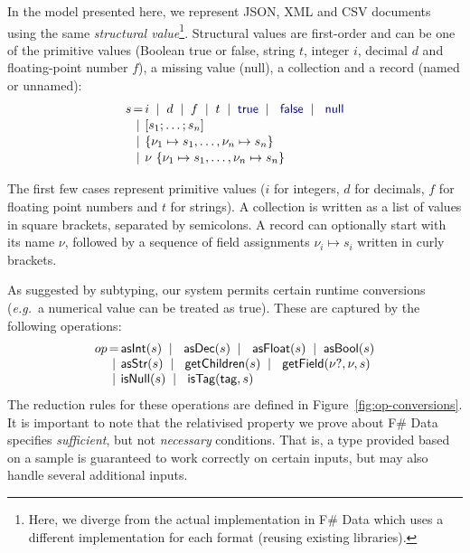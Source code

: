 \documentclass[preprint]{sigplanconf}
\newcommand{\kvd}[1]{\textnormal{\textcolor{kvdclr}{\sffamily #1}}}
\newcommand{\num}[1]{\textnormal{\textcolor{numclr}{\sffamily #1}}}
\newcommand{\ident}[1]{\textnormal{\sffamily #1}}
\newcommand{\lsep}[0]{\;\; | \;\;}
\newcommand{\narrow}[1]{\hspace{-0.85em} #1 \hspace{-0.85em}}
\begin{document}
In the model presented here, we represent JSON, XML and CSV documents using the same 
\emph{structural value}\footnote{Here, we diverge from the actual implementation in F\# Data which 
uses a different implementation for each format (reusing existing libraries).}. Structural values are 
first-order and can be one of the primitive values (Boolean \kvd{true} or \kvd{false}, string $t$, 
integer $i$, decimal $d$ and floating-point number $f$), a missing value (\kvd{null}), a collection 
and a record (named or unnamed):
%
\begin{equation*}
\begin{array}{lcl}
 s  &\narrow{=}& i \lsep d \lsep f \lsep t \lsep \kvd{true} \lsep \kvd{false} \lsep \kvd{null} \\[0.1em]
    &\narrow{|}& [s_1; \ldots; s_n] \\[0.1em]
    &\narrow{|}& \{ \nu_1 \mapsto s_1, \ldots, \nu_n \mapsto s_n \}\\[0.1em]
    &\narrow{|}& \nu~\{ \nu_1 \mapsto s_1, \ldots, \nu_n \mapsto s_n \} \\
\end{array}
\end{equation*}

\noindent
The first few cases represent primitive values ($i$ for integers, $d$ for decimals, $f$ for floating
point numbers and $t$ for strings). A collection is written as a list of values in square brackets, 
separated by semicolons. A record can optionally start with its name $\nu$, followed by a sequence of 
field assignments $\nu_i \mapsto s_i$ written in curly brackets.

As suggested by subtyping, our system permits certain runtime conversions (\emph{e.g.}~a numerical 
value \num{1} can be treated as \kvd{true}). These are captured by the following operations:
%
\begin{equation*}
\begin{array}{lcl}
 op &\narrow{=}& \ident{asInt}(s) \lsep \ident{asDec}(s) \lsep \ident{asFloat}(s) \lsep \ident{asBool}(s)  \\
    &\narrow{|}& \ident{asStr}(s) \lsep \ident{getChildren}(s) \lsep \ident{getField}(\nu?, \nu, s)\\
    &\narrow{|}& \ident{isNull}(s) \lsep \ident{isTag}(\ident{tag}, s)
\end{array}
\end{equation*}
%
The reduction rules for these operations are defined in Figure~\ref{fig:op-conversions}. It is important
to note that the relativised property we prove about F\# Data specifies \emph{sufficient}, but
not \emph{necessary} conditions. That is, a type provided based on a sample is guaranteed to work 
correctly on certain inputs, but may also handle several additional inputs.
\end{document}
